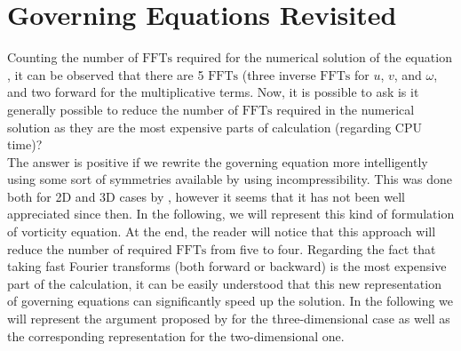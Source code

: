 \documentclass[12pt]{article}
\begin{document}
\section{Governing Equations Revisited}
Counting the number of $\text{FFTs}$ required for the numerical solution of
the equation , it can be observed that there are 5 $\text{FFTs}$
(three inverse $\text{FFTs}$ for $u$, $v$, and $\omega$, and two forward
for the multiplicative terms. Now, it is possible to ask is it generally
possible to reduce the number of $\text{FFTs}$ required in the numerical
solution as they are the most expensive parts of calculation (regarding CPU time)?		\\
The answer is positive if we rewrite the governing equation more intelligently using some sort of symmetries available by using incompressibility. This was done both for 2D and 3D cases by
, however it seems that it has not been well appreciated since then. In the following, we will represent this kind of formulation of vorticity equation. At the end, the reader will notice that this approach will reduce the number of required $\text{FFTs}$ from five to four. Regarding the fact that taking fast Fourier transforms (both forward or backward) is the most expensive part of the calculation, it can be easily understood that this new representation of governing equations can significantly speed up the solution. In the following we will represent the argument proposed by  for the three-dimensional case as well as the corresponding representation for the two-dimensional one. 	\\
\end{document}
